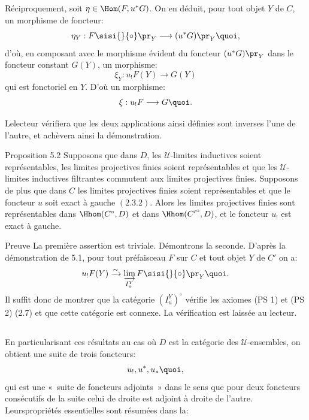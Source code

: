 Réciproquement, soit $\eta\in \Hom(F,u^\ast G)$. On en déduit, pour
tout objet $Y$ de $C$, un morphisme de foncteur:
$$
\eta_Y:F\sisi{}{\circ}\pr_Y\longrightarrow (u^\ast G)\pr_Y{\quoi},
$$
d'où, en composant avec le morphisme évident du foncteur $(u^\ast
G)\pr_Y$ dans le foncteur constant $G(Y)$, un morphisme:
$$
\xi_Y:u_{!}F(Y)\longrightarrow G(Y)
$$
qui est fonctoriel en $Y$. D'où un morphisme:
$$
\xi:u_{!}F\longrightarrow G{\quoi}.
$$

Le\pageoriginale lecteur vérifiera que les deux applications ainsi
définies sont inverses l'une de l'autre, et achèvera ainsi la
démonstration.

\begin{enonce*}{Proposition 5.2}
Supposons que dans $D$, les $𝒰$-limites inductives soient
représentables, les limites projectives finies soient représentables
et que les $𝒰$-limites inductives filtrantes commutent aux
limites projectives finies. Supposons de plus que dans $C$ les
limites projectives finies soient représentables et que le foncteur
$u$ soit exact à gauche $(\hyperref[I.cor2.3.2]{2.3.2})$. Alors les limites
projectives finies sont représentables dans $\Hhom(C^\circ, D)$ et
dans $\Hhom({C'}^\circ,D)$, et le foncteur $u_{!}$ est exact à
gauche.
\end{enonce*}

\begin{enonce*}[remark]{Preuve}
La première assertion est triviale. Démontrons la seconde. D'après
la démonstration de 5.1, pour tout préfaisceau $F$ sur $C$ et tout
objet $Y$ de $C'$ on a:
$$
u_{!}F(Y)\xrightarrow{\sim} \varinjlim_{I^Y_u}
F\sisi{}{\circ}\pr_Y{\quoi}.
$$
 Il suffit donc de montrer que la catégorie $(I^Y_u)^\circ$
 vérifie les axiomes (PS 1) et (PS 2) (2.7) et que cette catégorie
 est connexe. La vérification est laissée au lecteur.
\end{enonce*}

\setcounter{subsection}{2}
\subsection{}
En particularisant ces résultats au cas où $D$ est la catégorie des
$𝒰$-ensembles, on obtient une suite de trois foncteurs:
$$
u_{!}, u^\ast, u_\ast {\quoi},
$$
qui est une « suite de foncteurs adjoints » dans le sens que
pour deux foncteurs consécutifs de la suite celui de droite est
adjoint à droite de l'autre. Leurs\pageoriginale propriétés
essentielles sont résumées dans la:

